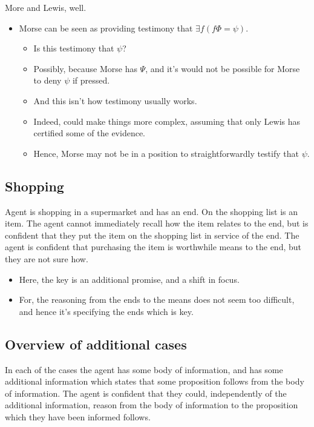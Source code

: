 \documentclass[10pt]{article}
\begin{document}
More and Lewis, well.
\begin{itemize}
\item Morse can be seen as providing testimony that \(\exists f(f\Phi = \psi)\).
  \begin{itemize}
  \item Is this testimony that \(\psi\)?
  \item Possibly, because Morse has \(\Psi\), and it's would not be possible for Morse to deny \(\psi\) if pressed.
  \item And this isn't how testimony usually works.
  \item Indeed, could make things more complex, assuming that only Lewis has certified some of the evidence.
  \item Hence, Morse may not be in a position to straightforwardly testify that \(\psi\).
  \end{itemize}
\end{itemize}


\subsection{Shopping}
\label{sec:shopping}

\begin{scenario}[Shopping]
  Agent is shopping in a supermarket and has an end.
  On the shopping list is an item.
  The agent cannot immediately recall how the item relates to the end, but is confident that they put the item on the shopping list in service of the end.
  The agent is confident that purchasing the item is worthwhile means to the end, but they are not sure how.
\end{scenario}

\begin{note}
  \begin{itemize}
  \item Here, the key is an additional promise, and a shift in focus.
  \item For, the reasoning from the ends to the means does not seem too difficult, and hence it's specifying the ends which is key.
  \end{itemize}
\end{note}


\subsection{Overview of additional cases}
\label{sec:overv-addit-cases}

In each of the cases the agent has some body of information, and has some additional information which states that some proposition follows from the body of information.
The agent is confident that they could, independently of the additional information, reason from the body of information to the proposition which they have been informed follows.
\end{document}
